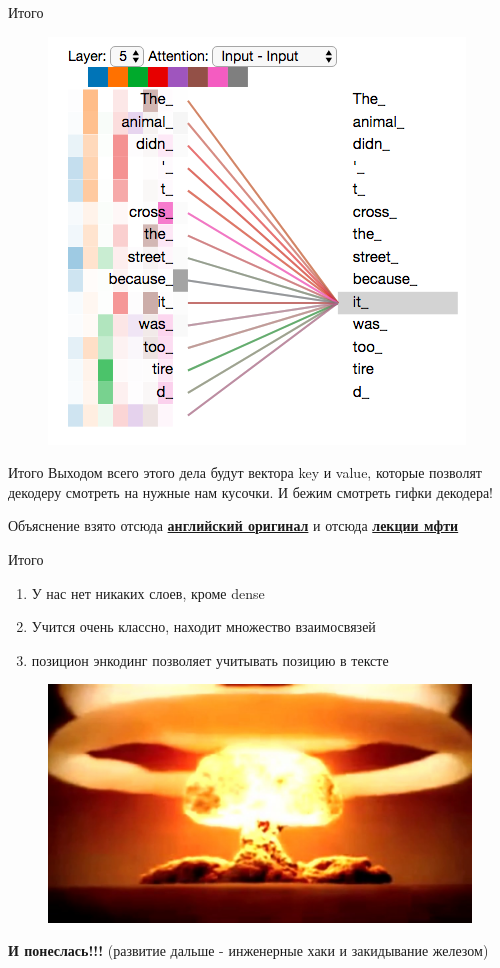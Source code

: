 \documentclass[notes,12pt, aspectratio=169]{beamer}
\begin{document}
\begin{frame}{Итого}
\begin{figure}
	\centering
	\includegraphics[width=0.5\linewidth]{images/transformer_self-attention_visualization_3}
	\label{fig:seq2seq}
\end{figure}
\end{frame}


\begin{frame}{Итого}
Выходом всего этого дела будут вектора key и value, которые позволят декодеру смотреть на нужные нам кусочки.
И бежим смотреть гифки декодера!

Объяснение взято отсюда \href{http://jalammar.github.io/illustrated-transformer/}{\textbf{английский оригинал}} и отсюда \href{https://www.youtube.com/watch?v=Bg8Y5q1OiP0&list=PL4_hYwCyhAvZeq93ssEUaR47xhvs7IhJM&index=4}{\textbf{лекции мфти}}
\end{frame}

\begin{frame}{Итого}
\begin{enumerate}
	\item У нас нет никаких слоев, кроме dense
	\item Учится очень классно, находит множество взаимосвязей
	\item позицион энкодинг позволяет учитывать позицию в тексте 
\end{enumerate}


\end{frame}

\begin{frame}
\begin{figure}
	\centering
	\includegraphics[width=0.8\linewidth]{images/maxresdefault}
	\label{fig:seq2seq}
\end{figure}
\textbf{И понеслась!!!} (развитие дальше - инженерные хаки и закидывание железом)
\end{frame}
\end{document}
